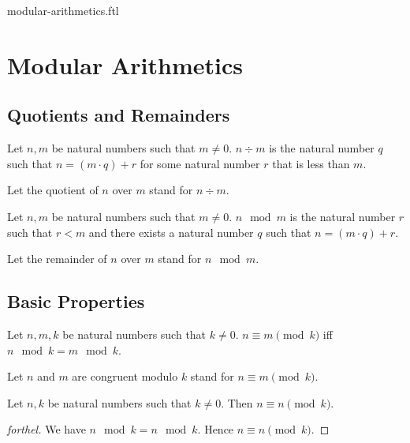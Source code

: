 \documentclass{naproche-library}
\begin{document}
\begin{smodule}{modular-arithmetics.ftl}


  \section*{Modular Arithmetics}

  \subsection*{Quotients and Remainders}

  \begin{definition}[forthel,id=ARITHMETIC_08_8621463798022144,printid]
    Let $n, m$ be natural numbers such that $m \neq 0$.
    $n \div m$ is the natural number $q$ such that $n = (m \cdot q) + r$ for some natural number $r$ that is less than $m$.

    Let the quotient of $n$ over $m$ stand for $n \div m$.
  \end{definition}

  \begin{definition}[forthel,id=ARITHMETIC_08_3560980160184320,printid]
    Let $n, m$ be natural numbers such that $m \neq 0$.
    $n \mod m$ is the natural number $r$ such that $r < m$ and there exists a natural number $q$ such that $n = (m \cdot q) + r$.

    Let the remainder of $n$ over $m$ stand for $n \mod m$.
  \end{definition}


  \subsection*{Basic Properties}

  \begin{definition}[forthel,id=ARITHMETIC_08_5448561831444480,printid]
    Let $n, m, k$ be natural numbers such that $k \neq 0$.
    $n \equiv m \pmod{k}$ iff $n \mod k = m \mod k$.

    Let $n$ and $m$ are congruent modulo $k$ stand for $n \equiv m \pmod{k}$.
  \end{definition}

  \begin{proposition}[forthel,id=ARITHMETIC_08_3818318544764928,printid]
    Let $n, k$ be natural numbers such that $k \neq 0$.
    Then $n \equiv n \pmod{k}$.
  \end{proposition}
  \begin{proof}[forthel]
    We have $n \mod k = n \mod k$.
    Hence $n \equiv n \pmod{k}$.
  \end{proof}


\end{smodule}
\end{document}

